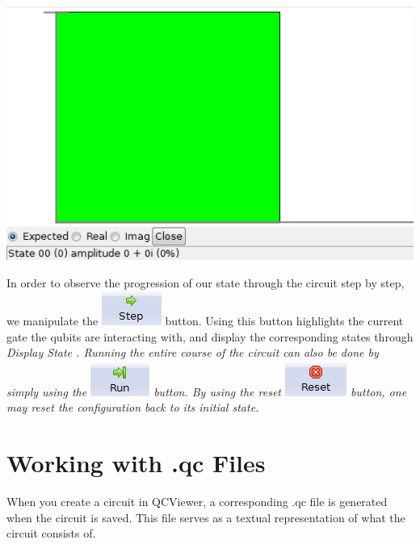 \documentclass[10pt]{article}
\theoremstyle{definition}
\begin{document}
\begin{center}
\includegraphics{Figures/CreateCircuit/DisplayState.png}
\end{center}

In order to observe the progression of our state through the circuit step by step, we manipulate the \includegraphics[scale=0.60]{Figures/Navigation/Step.png} button. Using this button highlights the current gate the qubits are interacting with, and display the corresponding states through \em Display State \em. Running the entire course of the circuit can also be done by simply using the \includegraphics[scale=0.60]{Figures/Navigation/Run.png} button. By using the reset \includegraphics[scale=0.60]{Figures/Navigation/Reset.png} button, one may reset the configuration back to its initial state.

\section{Working with .qc Files}\label{sec:QCFiles}

When you create a circuit in QCViewer, a corresponding .qc file is generated when the circuit is saved. This file serves as a textual representation of what the circuit consists of. 
\end{document}
